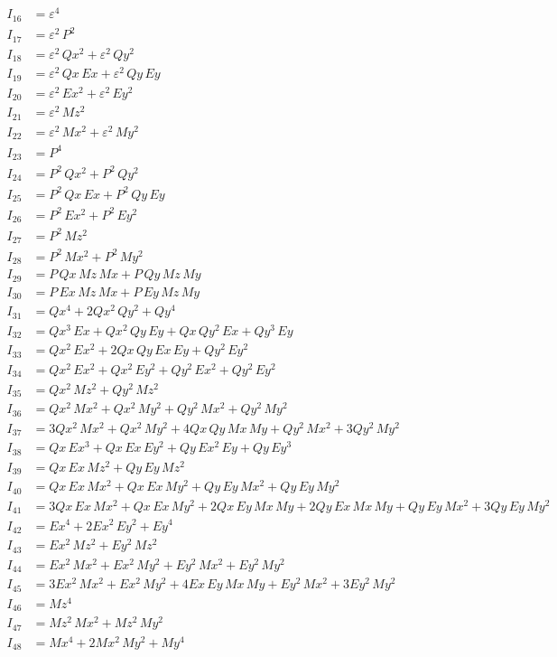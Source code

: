 \documentclass{article}
\begin{document}
\begin{align*}
I_{16} &= ε^{4} \\
I_{17} &= ε^{2}\,P^{2} \\
I_{18} &= ε^{2}\,Qx^{2} + ε^{2}\,Qy^{2} \\
I_{19} &= ε^{2}\,Qx\,Ex + ε^{2}\,Qy\,Ey \\
I_{20} &= ε^{2}\,Ex^{2} + ε^{2}\,Ey^{2} \\
I_{21} &= ε^{2}\,Mz^{2} \\
I_{22} &= ε^{2}\,Mx^{2} + ε^{2}\,My^{2} \\
I_{23} &= P^{4} \\
I_{24} &= P^{2}\,Qx^{2} + P^{2}\,Qy^{2} \\
I_{25} &= P^{2}\,Qx\,Ex + P^{2}\,Qy\,Ey \\
I_{26} &= P^{2}\,Ex^{2} + P^{2}\,Ey^{2} \\
I_{27} &= P^{2}\,Mz^{2} \\
I_{28} &= P^{2}\,Mx^{2} + P^{2}\,My^{2} \\
I_{29} &= P\,Qx\,Mz\,Mx + P\,Qy\,Mz\,My \\
I_{30} &= P\,Ex\,Mz\,Mx + P\,Ey\,Mz\,My \\
I_{31} &= Qx^{4} + 2Qx^{2}\,Qy^{2} + Qy^{4} \\
I_{32} &= Qx^{3}\,Ex + Qx^{2}\,Qy\,Ey + Qx\,Qy^{2}\,Ex + Qy^{3}\,Ey \\
I_{33} &= Qx^{2}\,Ex^{2} + 2Qx\,Qy\,Ex\,Ey + Qy^{2}\,Ey^{2} \\
I_{34} &= Qx^{2}\,Ex^{2} + Qx^{2}\,Ey^{2} + Qy^{2}\,Ex^{2} + Qy^{2}\,Ey^{2} \\
I_{35} &= Qx^{2}\,Mz^{2} + Qy^{2}\,Mz^{2} \\
I_{36} &= Qx^{2}\,Mx^{2} + Qx^{2}\,My^{2} + Qy^{2}\,Mx^{2} + Qy^{2}\,My^{2} \\
I_{37} &= 3Qx^{2}\,Mx^{2} + Qx^{2}\,My^{2} + 4Qx\,Qy\,Mx\,My + Qy^{2}\,Mx^{2} + 3Qy^{2}\,My^{2} \\
I_{38} &= Qx\,Ex^{3} + Qx\,Ex\,Ey^{2} + Qy\,Ex^{2}\,Ey + Qy\,Ey^{3} \\
I_{39} &= Qx\,Ex\,Mz^{2} + Qy\,Ey\,Mz^{2} \\
I_{40} &= Qx\,Ex\,Mx^{2} + Qx\,Ex\,My^{2} + Qy\,Ey\,Mx^{2} + Qy\,Ey\,My^{2} \\
I_{41} &= 3Qx\,Ex\,Mx^{2} + Qx\,Ex\,My^{2} + 2Qx\,Ey\,Mx\,My + 2Qy\,Ex\,Mx\,My + Qy\,Ey\,Mx^{2} + 3Qy\,Ey\,My^{2} \\
I_{42} &= Ex^{4} + 2Ex^{2}\,Ey^{2} + Ey^{4} \\
I_{43} &= Ex^{2}\,Mz^{2} + Ey^{2}\,Mz^{2} \\
I_{44} &= Ex^{2}\,Mx^{2} + Ex^{2}\,My^{2} + Ey^{2}\,Mx^{2} + Ey^{2}\,My^{2} \\
I_{45} &= 3Ex^{2}\,Mx^{2} + Ex^{2}\,My^{2} + 4Ex\,Ey\,Mx\,My + Ey^{2}\,Mx^{2} + 3Ey^{2}\,My^{2} \\
I_{46} &= Mz^{4} \\
I_{47} &= Mz^{2}\,Mx^{2} + Mz^{2}\,My^{2} \\
I_{48} &= Mx^{4} + 2Mx^{2}\,My^{2} + My^{4} \\
\end{align*}
\end{document}
